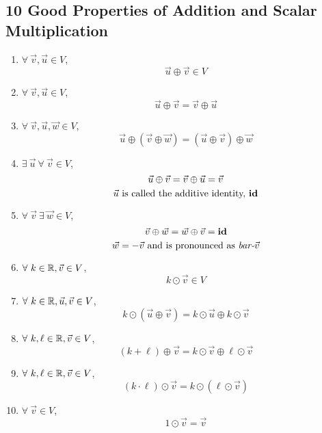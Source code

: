 \subsection*{10 Good Properties of Addition and Scalar Multiplication}
\begin{enumerate}
  \item {} $\forall~\vec{v}, \vec{u} \in V$,
        \[
          \vec{u} \oplus \vec{v} \in V
        \]
  \item {} $\forall~\vec{v}, \vec{u} \in V$,
        \[
          \vec{u} \oplus \vec{v} = \vec{v} \oplus \vec{u}
        \]
  \item {} $\forall~\vec{v}, \vec{u}, \vec{w} \in V$,
        \[
          \vec{u} \oplus (\vec{v} \oplus \vec{w}) = (\vec{u} \oplus \vec{v}) \oplus \vec{w}
        \]
  \item {} $\exists~\vec{u}~\forall~\vec{v} \in V$,
        \[
          \vec{u} \oplus \vec{v} = \vec{v} \oplus \vec{u} = \vec{v} \\
        \]
        \[
          \vec{u}~\text{is called the additive identity, \textbf{id}}
        \]
  \item {} $\forall~\vec{v}~\exists~\vec{w} \in V$,
        \[
          \vec{v} \oplus \vec{w} = \vec{w} \oplus \vec{v} = \text{\textbf{id}}
        \]
        \[
          \vec{w} = -\vec{v}~\text{and is pronounced as \textit{bar-$\vec{v}$}}
        \]
  \item {} $\forall~k \in \mathbb{R}, \vec{v} \in V$,
        \[
          k \odot \vec{v} \in V
        \]
  \item {} $\forall~k \in \mathbb{R}, \vec{u}, \vec{v} \in V$,
        \[
          k \odot (\vec{u} \oplus \vec{v}) = k \odot \vec{u} \oplus k \odot \vec{v}
        \]
  \item {} $\forall~k, \ell \in \mathbb{R}, \vec{v} \in V$,
        \[
          (k + \ell) \oplus \vec{v} = k \odot \vec{v} \oplus \ell \odot \vec{v}
        \]
  \item {} $\forall~k, \ell \in \mathbb{R}, \vec{v} \in V$,
        \[
          (k \cdot \ell) \odot \vec{v} = k \odot (\ell \odot \vec{v})
        \]
  \item {} $\forall~\vec{v} \in V$,
        \[
          1 \odot \vec{v} = \vec{v}
        \]
\end{enumerate}

